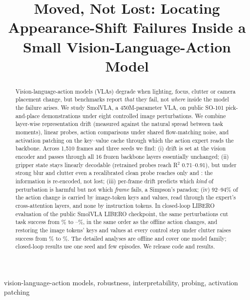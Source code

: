 \documentclass[conference]{IEEEtran}
\title{Moved, Not Lost: Locating Appearance-Shift Failures Inside a Small Vision-Language-Action Model}
\author{\IEEEauthorblockN{Tushar Bajaj}
\IEEEauthorblockA{Indian Institute of Technology Bombay\\
\texttt{tusharbajaj2085@gmail.com}}}
\begin{document}
\maketitle
\thispagestyle{plain}\pagestyle{plain}
\raggedbottom

\begin{abstract}
Vision-language-action models (VLAs) degrade when lighting, focus, clutter or camera placement change, but benchmarks report \emph{that} they fail, not \emph{where} inside the model the failure arises. We study SmolVLA, a 450M-parameter VLA, on public SO-101 pick-and-place demonstrations under eight controlled image perturbations. We combine layer-wise representation drift (measured against the natural spread between task moments), linear probes, action comparisons under shared flow-matching noise, and activation patching on the key--value cache through which the action expert reads the backbone. Across 1,510 frames and three seeds we find: (i) drift is set at the vision encoder and passes through all 16 frozen backbone layers essentially unchanged; (ii) gripper state stays linearly decodable (retrained probes reach R$^2$ 0.71--0.91), but under strong blur and clutter even a recalibrated clean probe reaches only \AffBlurTwo{} and \AffClutterTwo{}: the information is re-encoded, not lost; (iii) per-frame drift predicts which \emph{kind} of perturbation is harmful but not which \emph{frame} fails, a Simpson's paradox; (iv) 92--94\% of the action change is carried by image-token keys and values, read through the expert's cross-attention layers, and none by instruction tokens. In closed-loop LIBERO evaluation of the public SmolVLA LIBERO checkpoint, the same perturbations cut task success from \LbClean\% to \LbClutter--\LbDark\%, in the same order as the offline action changes, and restoring the image tokens' keys and values at every control step under clutter raises success from \PClutter\% to \PImg\%. The detailed analyses are offline and cover one model family; closed-loop results use one seed and few episodes. We release code and results.
\end{abstract}

\begin{IEEEkeywords}
vision-language-action models, robustness, interpretability, probing, activation patching
\end{IEEEkeywords}
\end{document}
